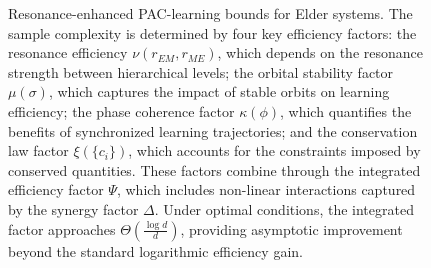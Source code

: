 \begin{figure}[t]
\caption{Resonance-enhanced PAC-learning bounds for Elder systems. The sample complexity is determined by four key efficiency factors: the resonance efficiency $\nu(r_{EM}, r_{ME})$, which depends on the resonance strength between hierarchical levels; the orbital stability factor $\mu(\sigma)$, which captures the impact of stable orbits on learning efficiency; the phase coherence factor $\kappa(\phi)$, which quantifies the benefits of synchronized learning trajectories; and the conservation law factor $\xi(\{c_i\})$, which accounts for the constraints imposed by conserved quantities. These factors combine through the integrated efficiency factor $\Psi$, which includes non-linear interactions captured by the synergy factor $\Delta$. Under optimal conditions, the integrated factor approaches $\Theta(\frac{\log d}{d})$, providing asymptotic improvement beyond the standard logarithmic efficiency gain.}
\label{fig:resonance_pac}
\end{figure}